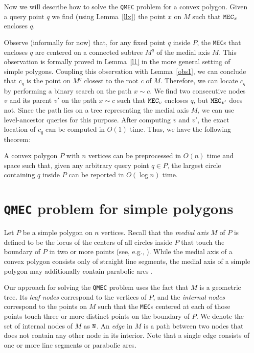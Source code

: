 \documentclass[12pt]{llncs}
\begin{document}
Now we will describe how to solve the {\tt QMEC} problem for a convex
polygon. Given a  query point $q$ we find (using Lemma\ \ref{llx}) the point $x$ on 
$M$ such that ${\tt MEC}_x$ encloses $q$. 

Observe (informally for now) that, for any fixed point $q$ inside $P$, the {\tt MEC}s 
that encloses $q$ are centered on a connected subtree $M^q$ of the medial axis $M
$. This observation is formally proved in Lemma\ \ref{l1} in the more general setting of 
simple polygons. Coupling this observation with Lemma\ \ref{obs1}, we can conclude 
that $c_q$ is the point on $M^q$ closest to the root $c$ of $M$. Therefore, we can 
locate $c_q$ by performing a binary
search on the path $x\sim c$. We find two consecutive nodes $v$ 
and its parent $v'$ on the path $x\sim c$ such that ${\tt MEC}_v$ encloses $q$, but 
${\tt MEC}_{v'}$ does not.  Since the path lies on a 
tree representing the medial axis $M$, we can use level-ancestor 
queries \cite{BF04} for this purpose. After computing $v$ and $v'$, 
the exact location of $c_q$ can be computed in $O(1)$ time. Thus, 
we have the following theorem:

\begin{theorem} \label{th-QMEC-convex}
A convex polygon $P$ with  $n$ vertices can be preprocessed in $O(n)$ time
and space such that, given any arbitrary query point $q \in P$, the largest circle 
containing 
$q$ inside $P$ 
can be reported in $O(\log n)$ time.
\end{theorem}



\vspace{-0.2in}
\section{{\tt QMEC} problem for simple polygons} \label{sec:simple-polygon-case}
Let $P$ be a simple polygon on $n$ vertices. Recall that the
{\it medial axis} $M$ of $P$ is defined to be the locus of  the centers of all
circles inside $P$ that touch the boundary of
$P$ in two or more points (see, e.g.,  \cite{CSW99}). While the medial axis of
a convex polygon consists only of straight line segments, the medial axis of 
a simple polygon may additionally contain parabolic arcs \cite{P1977}.

Our approach for solving the 
{\tt QMEC} problem uses the fact that 
$M$ is a geometric tree. Its {\it leaf nodes} 
correspond to the vertices of $P$, and the {\it internal nodes}
correspond to the points on $M$ such that the {\tt MEC}s  centered at each 
of those points touch three or more distinct points on the boundary 
of $P$. We  denote the set of internal nodes of $M$ as ${\tt N}$. An {\it edge} in 
$M$ is a path between two nodes that does not contain  any other node in its interior. Note that 
 a single edge  consists of one or more line segments or parabolic arcs.
\end{document}

